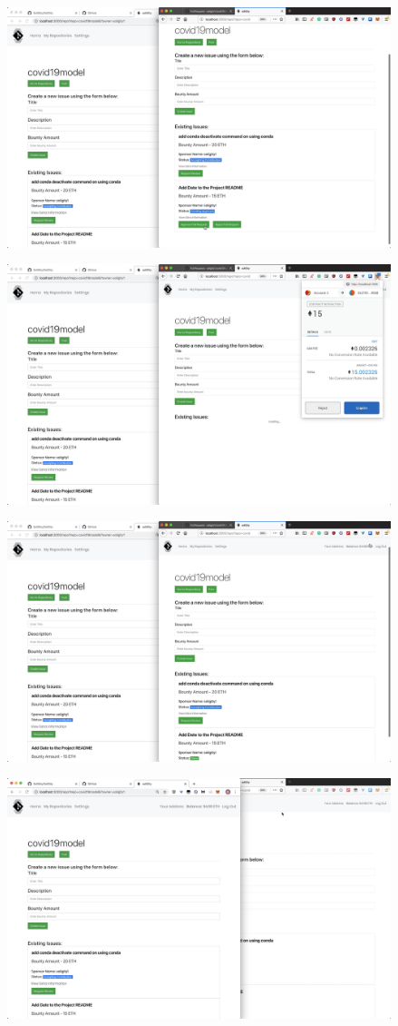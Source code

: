 \documentclass[12pt]{article}
\renewcommand{\_}{\kern-1.5pt\textunderscore\kern-1.5pt}
\begin{document}
\includegraphics[height=7cm]{graphs/40. alice_approve_pull_request}

\includegraphics[height=7cm]{graphs/41. alice_metamask_confirm}

\includegraphics[height=7cm]{graphs/42. alice_balance_updated}

\includegraphics[height=7cm]{graphs/43. bob_balance_updated}
\end{document}
